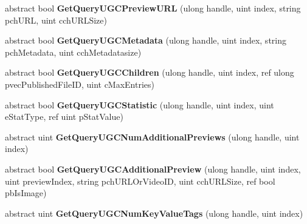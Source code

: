 \begin{DoxyCompactItemize}
\item 
\hypertarget{classValve_1_1Steamworks_1_1ISteamUGC_a8b69243a6f5f590ead58d942c855173c}{}abstract bool {\bfseries Get\+Query\+U\+G\+C\+Preview\+U\+R\+L} (ulong handle, uint index, string pch\+U\+R\+L, uint cch\+U\+R\+L\+Size)\label{classValve_1_1Steamworks_1_1ISteamUGC_a8b69243a6f5f590ead58d942c855173c}

\item 
\hypertarget{classValve_1_1Steamworks_1_1ISteamUGC_ab917b9063758b3ba44cb0a4024e408de}{}abstract bool {\bfseries Get\+Query\+U\+G\+C\+Metadata} (ulong handle, uint index, string pch\+Metadata, uint cch\+Metadatasize)\label{classValve_1_1Steamworks_1_1ISteamUGC_ab917b9063758b3ba44cb0a4024e408de}

\item 
\hypertarget{classValve_1_1Steamworks_1_1ISteamUGC_a8df37156fe1feb67a21076f2750be29e}{}abstract bool {\bfseries Get\+Query\+U\+G\+C\+Children} (ulong handle, uint index, ref ulong pvec\+Published\+File\+I\+D, uint c\+Max\+Entries)\label{classValve_1_1Steamworks_1_1ISteamUGC_a8df37156fe1feb67a21076f2750be29e}

\item 
\hypertarget{classValve_1_1Steamworks_1_1ISteamUGC_a4b91e1aae338aad56f97d68d776067a0}{}abstract bool {\bfseries Get\+Query\+U\+G\+C\+Statistic} (ulong handle, uint index, uint e\+Stat\+Type, ref uint p\+Stat\+Value)\label{classValve_1_1Steamworks_1_1ISteamUGC_a4b91e1aae338aad56f97d68d776067a0}

\item 
\hypertarget{classValve_1_1Steamworks_1_1ISteamUGC_a50725c7b13708a78b87c2de3d6c15453}{}abstract uint {\bfseries Get\+Query\+U\+G\+C\+Num\+Additional\+Previews} (ulong handle, uint index)\label{classValve_1_1Steamworks_1_1ISteamUGC_a50725c7b13708a78b87c2de3d6c15453}

\item 
\hypertarget{classValve_1_1Steamworks_1_1ISteamUGC_a0c0e5f8c67b616a6d0c29b1ab6b89de6}{}abstract bool {\bfseries Get\+Query\+U\+G\+C\+Additional\+Preview} (ulong handle, uint index, uint preview\+Index, string pch\+U\+R\+L\+Or\+Video\+I\+D, uint cch\+U\+R\+L\+Size, ref bool pb\+Is\+Image)\label{classValve_1_1Steamworks_1_1ISteamUGC_a0c0e5f8c67b616a6d0c29b1ab6b89de6}

\item 
\hypertarget{classValve_1_1Steamworks_1_1ISteamUGC_a2bead6b375e18678c54acd30acde3128}{}abstract uint {\bfseries Get\+Query\+U\+G\+C\+Num\+Key\+Value\+Tags} (ulong handle, uint index)\label{classValve_1_1Steamworks_1_1ISteamUGC_a2bead6b375e18678c54acd30acde3128}


\end{DoxyCompactItemize}

